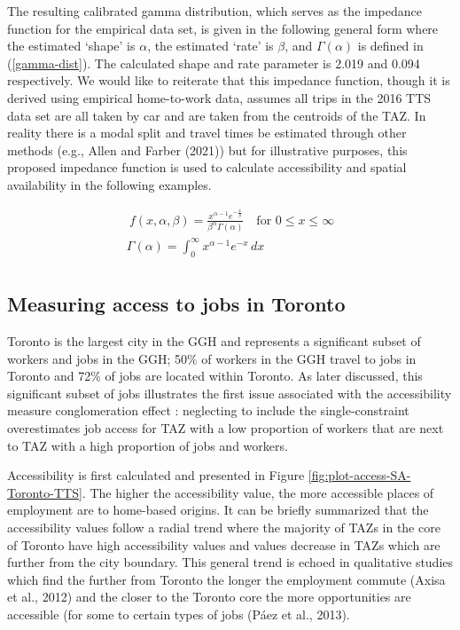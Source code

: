 \documentclass[]{elsarticle} %
\begin{document}
The resulting calibrated gamma distribution, which serves as the
impedance function for the empirical data set, is given in the following
general form where the estimated `shape' is \(\alpha\), the estimated
`rate' is \(\beta\), and \(\Gamma(\alpha)\) is defined in
(\ref{gamma-dist}). The calculated shape and rate parameter is 2.019 and
0.094 respectively. We would like to reiterate that this impedance
function, though it is derived using empirical home-to-work data,
assumes all trips in the 2016 TTS data set are all taken by car and are
taken from the centroids of the TAZ. In reality there is a modal split
and travel times be estimated through other methods (e.g., Allen and
Farber (2021)) but for illustrative purposes, this proposed impedance
function is used to calculate accessibility and spatial availability in
the following examples.

\begin{equation}
\label{gamma-dist}
\begin{array}{l}\ 
f(x, \alpha, \beta) = \frac {x^{\alpha-1}e^{-\frac{x}{\beta}}}{ \beta^{\alpha}\Gamma(\alpha)} \quad \text{for } 0 \leq x \leq \infty\\

\Gamma(\alpha) =  \int_{0}^{\infty} x^{\alpha-1}e^{-x} \,dx\\
\end{array}
\end{equation}

\hypertarget{measuring-access-to-jobs-in-toronto}{%
\subsection{Measuring access to jobs in
Toronto}\label{measuring-access-to-jobs-in-toronto}}

Toronto is the largest city in the GGH and represents a significant
subset of workers and jobs in the GGH; 50\% of workers in the GGH travel
to jobs in Toronto and 72\% of jobs are located within Toronto. As later
discussed, this significant subset of jobs illustrates the first issue
associated with the accessibility measure conglomeration effect :
neglecting to include the single-constraint overestimates job access for
TAZ with a low proportion of workers that are next to TAZ with a high
proportion of jobs and workers.

Accessibility is first calculated and presented in Figure
\ref{fig:plot-access-SA-Toronto-TTS}. The higher the accessibility
value, the more accessible places of employment are to home-based
origins. It can be briefly summarized that the accessibility values
follow a radial trend where the majority of TAZs in the core of Toronto
have high accessibility values and values decrease in TAZs which are
further from the city boundary. This general trend is echoed in
qualitative studies which find the further from Toronto the longer the
employment commute (Axisa et al., 2012) and the closer to the Toronto
core the more opportunities are accessible (for some to certain types of
jobs (Páez et al., 2013).
\end{document}
